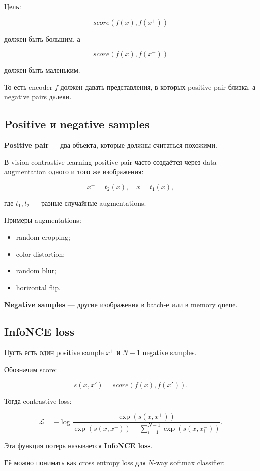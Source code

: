 \documentclass[a4paper,12pt]{article}
\begin{document}
Цель:

\[
score(f(x), f(x^+))
\]

должен быть большим, а

\[
score(f(x), f(x^-))
\]

должен быть маленьким.

То есть encoder \(f\) должен давать представления, в которых positive pair близка, а negative pairs далеки.

\subsection{Positive и negative samples}

\textbf{Positive pair} --- два объекта, которые должны считаться похожими.

В vision contrastive learning positive pair часто создаётся через data augmentation одного и того же изображения:

\[
x^+ = t_2(x),
\quad
x = t_1(x),
\]

где \(t_1,t_2\) --- разные случайные augmentations.

Примеры augmentations:

\begin{itemize}
    \item random cropping;
    \item color distortion;
    \item random blur;
    \item horizontal flip.
\end{itemize}

\textbf{Negative samples} --- другие изображения в batch-е или в memory queue.

\subsection{InfoNCE loss}

Пусть есть один positive sample \(x^+\) и \(N-1\) negative samples.

Обозначим score:

\[
s(x, x') = score(f(x), f(x')).
\]

Тогда contrastive loss:

\[
\mathcal{L}
=
-
\log
\frac{
\exp(s(x,x^+))
}{
\exp(s(x,x^+))
+
\sum_{i=1}^{N-1}
\exp(s(x,x_i^-))
}.
\]

Эта функция потерь называется \textbf{InfoNCE loss}.

Её можно понимать как cross entropy loss для \(N\)-way softmax classifier:
\end{document}

